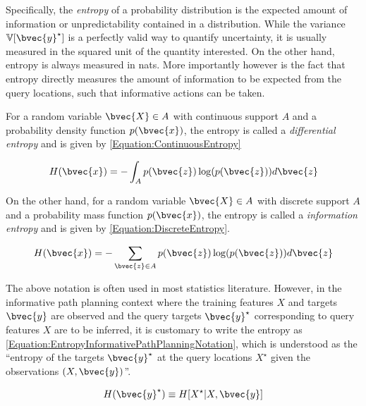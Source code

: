 			Specifically, the \textit{entropy} of a probability distribution is the expected amount of information or unpredictability contained in a distribution. While the variance $\mathbb{V}[\bvec{y}^{\star}]$ is a perfectly valid way to quantify uncertainty, it is usually measured in the squared unit of the quantity interested. On the other hand, entropy is always measured in nats. More importantly however is the fact that entropy directly measures the amount of information to be expected from the query locations, such that informative actions can be taken.
			
			For a random variable $\bvec{X} \in A$ with continuous support $A$ and a probability density function $p(\bvec{x})$, the entropy is called a \textit{differential entropy} and is given by \eqref{Equation:ContinuousEntropy}
			
			\begin{equation}
				H(\bvec{x}) = - \int_{A} p(\bvec{z}) \log(p(\bvec{z})) d\bvec{z}
			\label{Equation:ContinuousEntropy}
			\end{equation}
										
			On the other hand, for a random variable $\bvec{X} \in A$ with discrete support $A$ and a probability mass function $p(\bvec{x})$, the entropy is called a \textit{information entropy} \cite{ShannonEntropy} and is given by \eqref{Equation:DiscreteEntropy}.
			
			\begin{equation}
				H(\bvec{x}) = - \sum_{\bvec{z} \in A} p(\bvec{z}) \log(p(\bvec{z})) d\bvec{z}
			\label{Equation:DiscreteEntropy}
			\end{equation}
			
			The above notation is often used in most statistics literature. However, in the informative path planning context where the training features $X$ and targets $\bvec{y}$ are observed and the query targets $\bvec{y}^{\star}$ corresponding to query features $X$ are to be inferred, it is customary to write the entropy as \eqref{Equation:EntropyInformativePathPlanningNotation}, which is understood as the ``entropy of the targets $\bvec{y}^{\star}$ at the query locations $X^{\star}$ given the observations $(X, \bvec{y})$''.
			
			\begin{equation}
				H(\bvec{y}^{\star}) \equiv H[X^{\star} | X, \bvec{y}]
			\label{Equation:EntropyInformativePathPlanningNotation}
			\end{equation}
			
%	
%		
		
